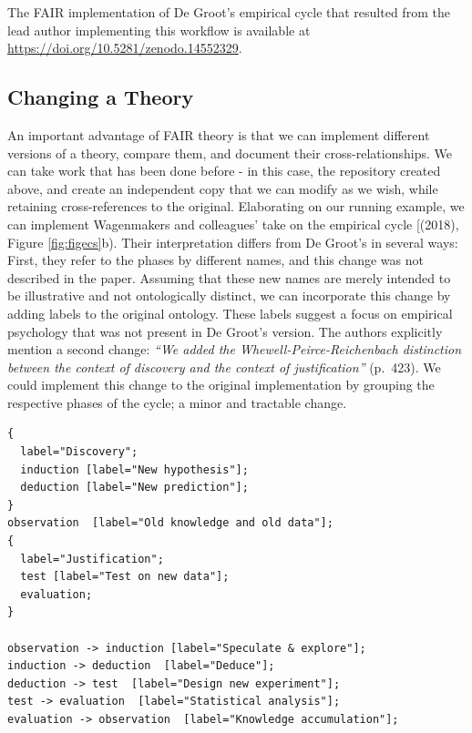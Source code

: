 \documentclass[
  man, noextraspace,floatsintext]{apa7}
\begin{document}
The FAIR implementation of De Groot's empirical cycle that resulted from the lead author implementing this workflow is available at \url{https://doi.org/10.5281/zenodo.14552329}.

\subsection{Changing a Theory}\label{changing-a-theory}

An important advantage of FAIR theory is that we can implement different versions of a theory, compare them, and document their cross-relationships.
We can take work that has been done before - in this case, the repository created above, and create an independent copy that we can modify as we wish, while retaining cross-references to the original.
Elaborating on our running example, we can implement Wagenmakers and colleagues' take on the empirical cycle {[}(2018), Figure \ref{fig:figecs}b).
Their interpretation differs from De Groot's in several ways:
First, they refer to the phases by different names, and this change was not described in the paper.
Assuming that these new names are merely intended to be illustrative and not ontologically distinct,
we can incorporate this change by adding labels to the original ontology.
These labels suggest a focus on empirical psychology that was not present in De Groot's version.
The authors explicitly mention a second change: \emph{``We added the Whewell-Peirce-Reichenbach distinction between the context of discovery and the context of justification''} (p.~423).
We could implement this change to the original implementation by grouping the respective phases of the cycle;
a minor and tractable change.

\begin{verbatim}
{
  label="Discovery";
  induction [label="New hypothesis"];
  deduction [label="New prediction"];
}
observation  [label="Old knowledge and old data"];
{
  label="Justification";
  test [label="Test on new data"];
  evaluation;
}

observation -> induction [label="Speculate & explore"];
induction -> deduction  [label="Deduce"];
deduction -> test  [label="Design new experiment"];
test -> evaluation  [label="Statistical analysis"];
evaluation -> observation  [label="Knowledge accumulation"];
\end{verbatim}
\end{document}
